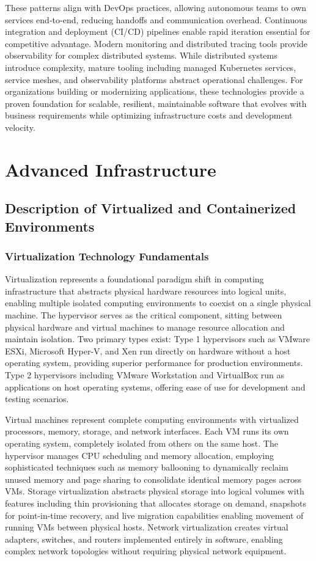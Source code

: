 \documentclass[a4paper, 12pt]{report}
\begin{document}
These patterns align with DevOps practices, allowing autonomous teams to own services end-to-end, reducing handoffs and communication overhead. Continuous integration and deployment (CI/CD) pipelines enable rapid iteration essential for competitive advantage. Modern monitoring and distributed tracing tools provide observability for complex distributed systems. While distributed systems introduce complexity, mature tooling including managed Kubernetes services, service meshes, and observability platforms abstract operational challenges. For organizations building or modernizing applications, these technologies provide a proven foundation for scalable, resilient, maintainable software that evolves with business requirements while optimizing infrastructure costs and development velocity.

\section{Advanced Infrastructure}

\subsection{Description of Virtualized and Containerized Environments}

\subsubsection{Virtualization Technology Fundamentals}

Virtualization represents a foundational paradigm shift in computing infrastructure that abstracts physical hardware resources into logical units, enabling multiple isolated computing environments to coexist on a single physical machine. The hypervisor serves as the critical component, sitting between physical hardware and virtual machines to manage resource allocation and maintain isolation. Two primary types exist: Type 1 hypervisors such as VMware ESXi, Microsoft Hyper-V, and Xen run directly on hardware without a host operating system, providing superior performance for production environments. Type 2 hypervisors including VMware Workstation and VirtualBox run as applications on host operating systems, offering ease of use for development and testing scenarios.

Virtual machines represent complete computing environments with virtualized processors, memory, storage, and network interfaces. Each VM runs its own operating system, completely isolated from others on the same host. The hypervisor manages CPU scheduling and memory allocation, employing sophisticated techniques such as memory ballooning to dynamically reclaim unused memory and page sharing to consolidate identical memory pages across VMs. Storage virtualization abstracts physical storage into logical volumes with features including thin provisioning that allocates storage on demand, snapshots for point-in-time recovery, and live migration capabilities enabling movement of running VMs between physical hosts. Network virtualization creates virtual adapters, switches, and routers implemented entirely in software, enabling complex network topologies without requiring physical network equipment.
\end{document}
